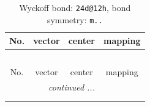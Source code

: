 \documentclass[fleqn,8pt]{jsarticle}
\begin{document}
\renewcommand{\arraystretch}{1.2}
\begin{longtable}{cccc}
\caption{Wyckoff bond: {\tt 24d@12h}, bond symmetry: {\tt m..}}
 \\
 \hline \hline
No. & vector & center & mapping \\ \hline \endfirsthead

\multicolumn{3}{l}{\tablename\ \thetable{}} \\
 \hline \hline
No. & vector & center & mapping \\ \hline \endhead

 \hline \hline
\multicolumn{3}{r}{\footnotesize\it continued ...} \\ \endfoot

 \hline \hline
\multicolumn{3}{r}{} \\ \endlastfoot


\end{longtable}
\end{document}
